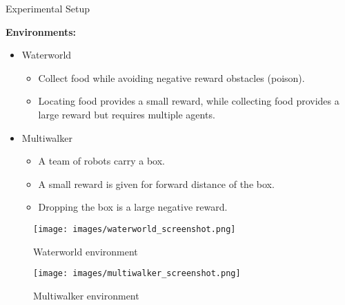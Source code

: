 \documentclass[xcolor={svgnames}]{beamer}
\begin{document}
\begin{frame}{Experimental Setup}
    \begin{multicols}{2}
        \textbf{Environments:}
        \begin{itemize}
            \item Waterworld
            \begin{itemize}
                \item Collect food while avoiding negative reward obstacles (poison).
                \item Locating food provides a small reward, 
                    while collecting food provides a large reward but requires multiple agents.
            \end{itemize}
            \item Multiwalker
            \begin{itemize}
                \item A team of robots carry a box.
                \item A small reward is given for forward distance of the box.
                \item Dropping the box is a large negative reward.
            \end{itemize}
        \end{itemize}

        \vfil

        \begin{figure}
            \texttt{[image: images/waterworld\_screenshot.png]}
            \caption{Waterworld environment}
        \end{figure}
        \vspace{-1em}
        \begin{figure}
            \texttt{[image: images/multiwalker\_screenshot.png]}
            \caption{Multiwalker environment}
        \end{figure}
    \end{multicols}
\end{frame}

\end{document}
